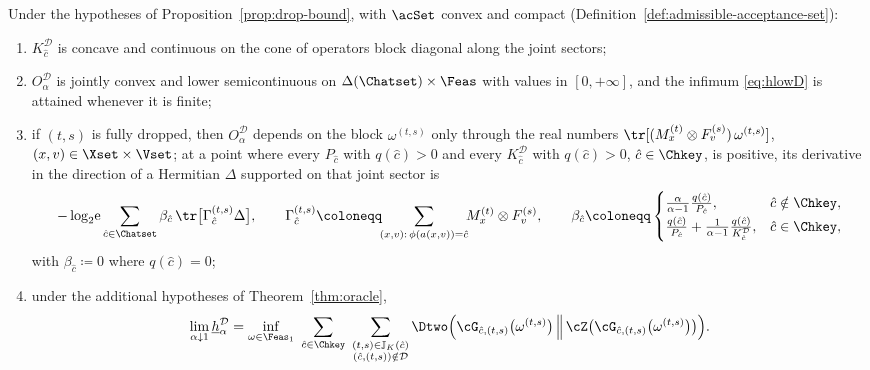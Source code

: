 \begin{corollary}\label{cor:drop-program}
Under the hypotheses of Proposition~\ref{prop:drop-bound}, with $\acSet$
convex and compact (Definition~\ref{def:admissible-acceptance-set}):
\begin{enumerate}[label=(\roman*),leftmargin=2.2em]
\item $K^{\mathcal{D}}_{\hat c}$ is concave and continuous on the cone of
operators block diagonal along the joint sectors;
\item $O^{\mathcal{D}}_{\alpha}$ is jointly convex and lower semicontinuous on
$\Delta(\Chatset)\times\Feas$ with values in $[0,+\infty]$, and the infimum
\eqref{eq:hlowD} is attained whenever it is finite;
\item if $(t,s)$ is fully dropped, then $O^{\mathcal{D}}_{\alpha}$ depends on
the block $\omega^{(t,s)}$ only through the real numbers
$\tr[(M^{(t)}_x\otimes F^{(s)}_v)\,\omega^{(t,s)}]$, $(x,v)\in\Xset\times\Vset$;
at a point where every $P_{\hat c}$ with $q(\hat c)>0$ and every
$K^{\mathcal{D}}_{\hat c}$ with $q(\hat c)>0$, $\hat c\in\Chkey$, is
positive, its derivative in the direction of a Hermitian $\Delta$ supported
on that joint sector is
\begin{equation}\label{eq:drop-gradient}
  -\log_2\!\mathrm{e}\sum_{\hat c\in\Chatset}\beta_{\hat c}\,
  \tr\big[\Gamma^{(t,s)}_{\hat c}\Delta\big],\qquad
  \Gamma^{(t,s)}_{\hat c}\coloneqq\!\!\sum_{(x,v):\,\phi(a(x,v))=\hat c}\!\!
  M^{(t)}_x\otimes F^{(s)}_v,\qquad
  \beta_{\hat c}\coloneqq
  \begin{cases}
   \frac{\alpha}{\alpha-1}\frac{q(\hat c)}{P_{\hat c}},&\hat c\notin\Chkey,\\[0.6ex]
   \frac{q(\hat c)}{P_{\hat c}}+\frac{1}{\alpha-1}
   \frac{q(\hat c)}{K^{\mathcal{D}}_{\hat c}},&\hat c\in\Chkey,
  \end{cases}
\end{equation}
with $\beta_{\hat c}\coloneqq0$ where $q(\hat c)=0$;
\item under the additional hypotheses of Theorem~\ref{thm:oracle},
\begin{equation}\label{eq:drop-oracle}
  \lim_{\alpha\downarrow1}\underline{h}^{\mathcal{D}}_{\alpha}
  =\inf_{\omega\in\Feas_1}\ \sum_{\hat c\in\Chkey}\
  \sum_{\substack{(t,s)\in\mathbb{J}_K(\hat c)\\(\hat c,(t,s))\notin\mathcal{D}}}
  \Dtwo\Big(\cG_{\hat c,(t,s)}\big(\omega^{(t,s)}\big)\,\Big\|\,
  \cZ\big(\cG_{\hat c,(t,s)}\big(\omega^{(t,s)}\big)\big)\Big).
\end{equation}
\end{enumerate}
\end{corollary}

